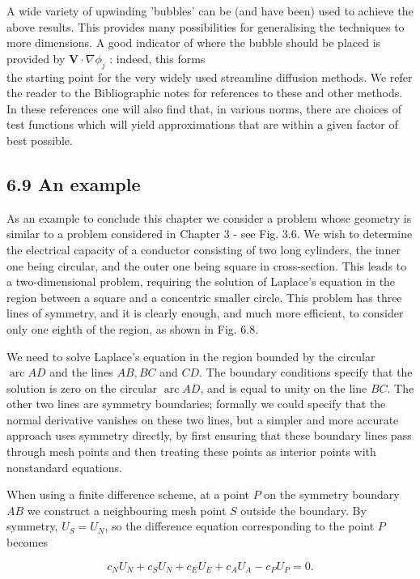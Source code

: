 \documentclass[10pt]{article}
\begin{document}
A wide variety of upwinding 'bubbles' can be (and have been) used to achieve the above results. This provides many possibilities for generalising the techniques to more dimensions. A good indicator of where the bubble should be placed is provided by \(\mathbf{V} \cdot \nabla \phi_{j}\) : indeed, this forms\\
the starting point for the very widely used streamline diffusion methods. We refer the reader to the Bibliographic notes for references to these and other methods. In these references one will also find that, in various norms, there are choices of test functions which will yield approximations that are within a given factor of best possible.

\subsection*{6.9 An example}
As an example to conclude this chapter we consider a problem whose geometry is similar to a problem considered in Chapter 3 - see Fig. 3.6. We wish to determine the electrical capacity of a conductor consisting of two long cylinders, the inner one being circular, and the outer one being square in cross-section. This leads to a two-dimensional problem, requiring the solution of Laplace's equation in the region between a square and a concentric smaller circle. This problem has three lines of symmetry, and it is clearly enough, and much more efficient, to consider only one eighth of the region, as shown in Fig. 6.8.

We need to solve Laplace's equation in the region bounded by the circular \(\operatorname{arc} A D\) and the lines \(A B, B C\) and \(C D\). The boundary conditions specify that the solution is zero on the circular \(\operatorname{arc} A D\), and is equal to unity on the line \(B C\). The other two lines are symmetry boundaries; formally we could specify that the normal derivative vanishes on these two lines, but a simpler and more accurate approach uses symmetry directly, by first ensuring that these boundary lines pass through mesh points and then treating these points as interior points with nonstandard equations.

When using a finite difference scheme, at a point \(P\) on the symmetry boundary \(A B\) we construct a neighbouring mesh point \(S\) outside the boundary. By symmetry, \(U_{S}=U_{N}\), so the difference equation corresponding to the point \(P\) becomes

\[
c_{N} U_{N}+c_{S} U_{N}+c_{E} U_{E}+c_{A} U_{A}-c_{P} U_{P}=0 .
\]
\end{document}

